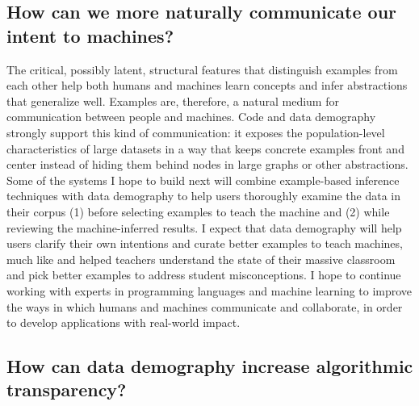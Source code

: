 \documentclass[justified]{tufte-handout}
\begin{document}
\subsection{How can we more naturally communicate our intent to machines?}
The critical, possibly latent, structural features that distinguish examples from each other help both humans and machines learn concepts and infer abstractions that generalize well. Examples are, therefore, a natural medium for communication between people and machines. Code and data demography strongly support this kind of communication: it exposes the population-level characteristics of large datasets in a way that keeps concrete examples front and center instead of hiding them behind nodes in large graphs or other abstractions. Some of the systems I hope to build next will combine example-based inference techniques with data demography to help users thoroughly examine the data in their corpus (1) before selecting examples to teach the machine and (2) while reviewing the machine-inferred results. I expect that data demography will help users clarify their own intentions\cite{vule} and curate better examples to teach machines, much like  and  helped teachers understand the state of their massive classroom and pick better examples to address student misconceptions. I hope to continue working with experts in programming languages and machine learning to improve the ways in which humans and machines communicate and collaborate, in order to develop applications with real-world impact.
 


\subsection{How can data demography increase algorithmic transparency?}
\end{document}
